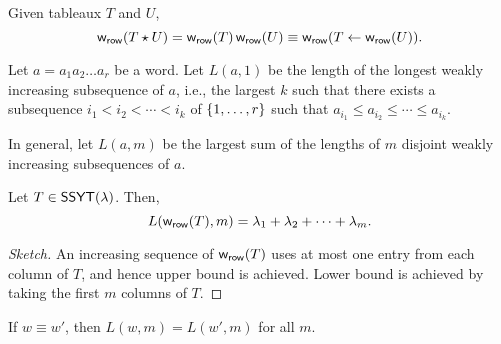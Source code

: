 \begin{lemma}
    Given tableaux \(T\) and \(U\),
    \begin{equation}
        \operatorname{\mathsf{w}_{\text{\textsf{row}}}}(T \star U) = \operatorname{\mathsf{w}_{\text{\textsf{row}}}}(T) \operatorname{\mathsf{w}_{\text{\textsf{row}}}}(U) \equiv \operatorname{\mathsf{w}_{\text{\textsf{row}}}}(T \leftarrow \operatorname{\mathsf{w}_{\text{\textsf{row}}}}(U)).
    \end{equation}
\end{lemma}

Let \(a = a_1a_2 \dots a_r\) be a word.
Let \(L(a, 1)\) be the length of the longest weakly increasing subsequence of \(a\),
i.e., the largest \(k\) such that there exists a subsequence \(i_1 < i_2 < \cdots < i_k\) of \(\interval{r}\) such that \(a_{i_1} \leq a_{i_2} \leq \cdots \leq a_{i_k}\).

In general, let \(L(a, m)\) be the largest sum of the lengths of \(m\) disjoint weakly increasing subsequences of \(a\).

\begin{lemma}
    Let \(T \in \operatorname{\mathsf{SSYT}}(\lambda)\).
    Then,
    \begin{equation}
        L(\operatorname{\mathsf{w}_{\text{\textsf{row}}}}(T), m) = \lambda_1 + \lambda_2 + \cdots + \lambda_m.
    \end{equation}
\end{lemma}

\begin{proof}[Sketch]
    An increasing sequence of \(\operatorname{\mathsf{w}_{\text{\textsf{row}}}}(T)\) uses at most one entry from each column of \(T\), and hence upper bound is achieved.
    Lower bound is achieved by taking the first \(m\) columns of \(T\).
\end{proof}

\begin{lemma}
    If \(w \equiv w'\), then \(L(w, m) = L(w', m)\) for all \(m\).
\end{lemma}

